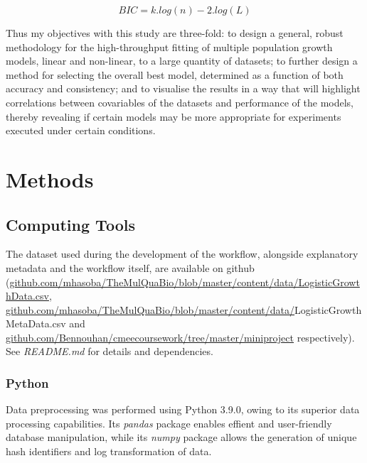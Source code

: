 \documentclass[11pt]{article}
\begin{document}
\begin{equation}
    BIC = k.log(n) - 2.log(L)
\end{equation}
\vspace{2mm}

\noindent
Thus my objectives with this study are three-fold: to design a general, robust methodology for the high-throughput fitting of multiple population growth models, linear and non-linear, to a large quantity of datasets; to further design a method for selecting the overall best model, determined as a function of both accuracy and consistency; and to visualise the results in a way that will highlight correlations between covariables of the datasets and performance of the models, thereby revealing if certain models may be more appropriate for experiments executed under certain conditions.



\vspace{5mm}
\section{Methods}%

\subsection{Computing Tools}
The dataset used during the development of the workflow, alongside explanatory metadata and the workflow itself, are available on github (\url{github.com/mhasoba/TheMulQuaBio/blob/master/content/data/LogisticGrowthData.csv}, \url{github.com/mhasoba/TheMulQuaBio/blob/master/content/data/}LogisticGrowthMetaData.csv and \url{github.com/Bennouhan/cmeecoursework/tree/master/miniproject} respectively). See \textit{README.md} for details and dependencies.

\subsubsection{Python}
Data preprocessing was performed using Python 3.9.0, owing to its superior data processing capabilities. Its \textit{pandas} package enables effient and user-friendly database manipulation, while its \textit{numpy} package allows the generation of unique hash identifiers and log transformation of data.
\end{document}
